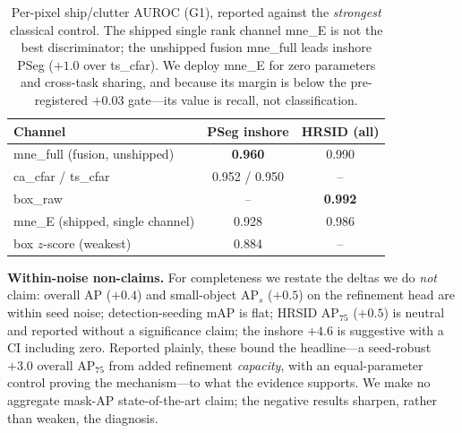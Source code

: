 \documentclass[journal]{IEEEtran}
\begin{document}
\begin{table}[t]
\centering
\caption{Per-pixel ship/clutter AUROC (G1), reported against the \emph{strongest} classical control. The shipped single rank channel mne\_E is not the best discriminator; the unshipped fusion mne\_full leads inshore PSeg ($+1.0$ over ts\_cfar). We deploy mne\_E for zero parameters and cross-task sharing, and because its margin is below the pre-registered $+0.03$ gate---its value is recall, not classification.}
\label{tab:g1}
\begin{tabular}{@{}lcc@{}}
\toprule
Channel & PSeg inshore & HRSID (all) \\
\midrule
mne\_full (fusion, unshipped)   & \textbf{0.960} & 0.990 \\
ca\_cfar / ts\_cfar             & 0.952 / 0.950 & -- \\
box\_raw                        & --            & \textbf{0.992} \\
mne\_E (shipped, single channel)& 0.928         & 0.986 \\
box $z$-score (weakest)         & 0.884         & -- \\
\bottomrule
\end{tabular}
\end{table}

\textbf{Within-noise non-claims.} For completeness we restate the deltas we do \emph{not} claim: overall AP ($+0.4$) and small-object AP$_{s}$ ($+0.5$) on the refinement head are within seed noise; detection-seeding mAP is flat; HRSID AP$_{75}$ ($+0.5$) is neutral and reported without a significance claim; the inshore $+4.6$ is suggestive with a CI including zero. Reported plainly, these bound the headline---a seed-robust $+3.0$ overall AP$_{75}$ from added refinement \emph{capacity}, with an equal-parameter control proving the mechanism---to what the evidence supports. We make no aggregate mask-AP state-of-the-art claim; the negative results sharpen, rather than weaken, the diagnosis.
\end{document}

